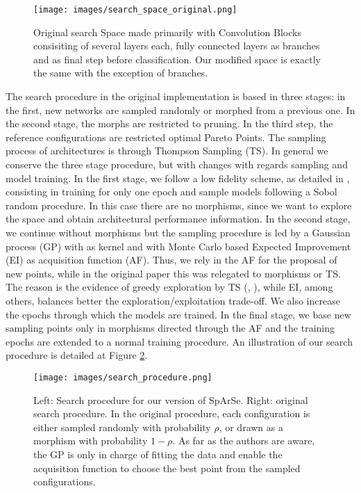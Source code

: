 \documentclass[a4paper, twocolumn]{article}
\begin{document}
\begin{figure}
	\centering
	\texttt{[image: images/search\_space\_original.png]}
	\caption{Original search Space made primarily with Convolution Blocks consisiting of several layers each, fully connected layers as branches and as final step before classification. Our modified space is exactly the same with the exception of branches.}
	\label{fig:searchspaceoriginal}
\end{figure}

The search procedure in the original implementation is based in three stages: in the first, new networks are sampled randomly or morphed from a previous one. In the second stage, the morphs are restricted to pruning. In the third step, the reference configurations are restricted optimal Pareto Points. The sampling process of architectures is through Thompson Sampling (TS). In general we conserve the three stage procedure, but with changes with regards sampling and model training. In the first stage, we follow a low fidelity scheme, as detailed in \cite{Elsken2019b}, consisting in training for only one epoch and sample models following a Sobol random procedure. In this case there are no morphisms, since we want to explore the space and obtain architectural performance information. In the second stage, we continue without morphisms but the sampling procedure is led by a Gaussian process (GP) with \cite{Swersky2014} as kernel and with Monte Carlo based Expected Improvement (EI) as acquisition function (AF). Thus, we rely in the AF for the proposal of new points, while in the original paper this was relegated to morphisms or TS. The reason is the evidence of greedy exploration by TS (\cite{Shahriari2016}, \cite{Shahriari2014}), while EI, among others, balances better the exploration/exploitation trade-off. We also increase  the epochs through which the models are trained. In the final stage, we base new sampling points only in morphisms directed through the AF and the training epochs are extended to a normal training procedure. An illustration of our search procedure is detailed at Figure \ref{fig:searchprocedure}.

\begin{figure}
	\centering
	\texttt{[image: images/search\_procedure.png]}
	\caption{Left: Search procedure for our version of SpArSe. Right: original search procedure. In the original procedure, each configuration is either sampled randomly with probability $\rho$, or drawn as a morphism with probability $1 - \rho$. As far as the authors are aware, the GP is only in charge of fitting the data and enable the acquisition function to choose the best point from the sampled configurations.}
	\label{fig:searchprocedure}
\end{figure}
\end{document}
